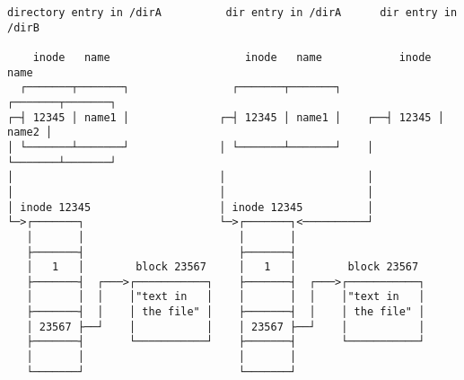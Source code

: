 \documentclass[varwidth=50em,crop]{standalone}
\begin{document}
\begin{verbatim}
directory entry in /dirA          dir entry in /dirA      dir entry in /dirB

    inode   name                     inode   name            inode   name
  ┌───────┬───────┐                ┌───────┬───────┐       ┌───────┬───────┐
┌─┤ 12345 │ name1 │              ┌─┤ 12345 │ name1 │    ┌──┤ 12345 │ name2 │
│ └───────┴───────┘              │ └───────┴───────┘    │  └───────┴───────┘
│                                │                      │
│                                │                      │
│ inode 12345                    │ inode 12345          │
└─>┌───────┐                     └─>┌───────┐<──────────┘
   │       │                        │       │
   ├───────┤                        ├───────┤
   │   1   │        block 23567     │   1   │        block 23567
   ├───────┤  ┌───>┌───────────┐    ├───────┤  ┌───>┌───────────┐
   │       │  │    │"text in   │    │       │  │    │"text in   │
   ├───────┤  │    │ the file" │    ├───────┤  │    │ the file" │
   │ 23567 ├──┘    │           │    │ 23567 ├──┘    │           │
   ├───────┤       └───────────┘    ├───────┤       └───────────┘
   │       │                        │       │
   └───────┘                        └───────┘
\end{verbatim}
\end{document}

